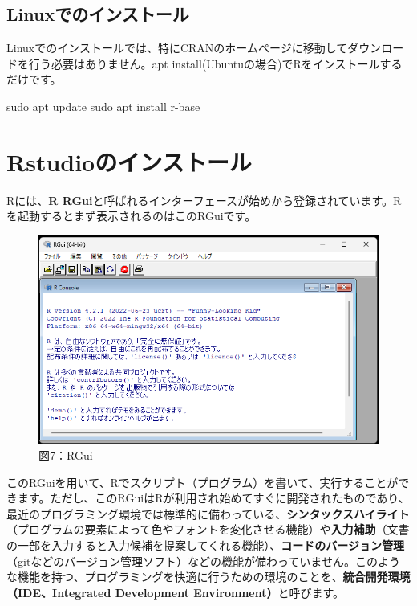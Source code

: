 \documentclass[
  letterpaper,
  DIV=11,
  numbers=noendperiod]{scrreprt}
\newenvironment{Shaded}{\begin{snugshade}}{\end{snugshade}}
\newcommand{\NormalTok}[1]{\textcolor[rgb]{0.00,0.23,0.31}{#1}}
\begin{document}
\hypertarget{linuxux3067ux306eux30a4ux30f3ux30b9ux30c8ux30fcux30eb}{%
\subsection{Linuxでのインストール}\label{linuxux3067ux306eux30a4ux30f3ux30b9ux30c8ux30fcux30eb}}

Linuxでのインストールでは、特にCRANのホームページに移動してダウンロードを行う必要はありません。apt
install(Ubuntuの場合)でRをインストールするだけです。

\begin{Shaded}
\begin{Highlighting}[]
\NormalTok{sudo apt update}
\NormalTok{sudo apt install r{-}base}
\end{Highlighting}
\end{Shaded}

\hypertarget{rstudioux306eux30a4ux30f3ux30b9ux30c8ux30fcux30eb}{%
\section{Rstudioのインストール}\label{rstudioux306eux30a4ux30f3ux30b9ux30c8ux30fcux30eb}}

Rには、\textbf{R
RGui}と呼ばれるインターフェースが始めから登録されています。Rを起動するとまず表示されるのはこのRGuiです。

\begin{figure}

{\centering \includegraphics{././image/RGUI.png}

}

\caption{図7：RGui}

\end{figure}

このRGuiを用いて、Rでスクリプト（プログラム）を書いて、実行することができます。ただし、このRGuiはRが利用され始めてすぐに開発されたものであり、最近のプログラミング環境では標準的に備わっている、\textbf{シンタックスハイライト}（プログラムの要素によって色やフォントを変化させる機能）や\textbf{入力補助}（文書の一部を入力すると入力候補を提案してくれる機能）、\textbf{コードのバージョン管理}（\href{https://git-scm.com/}{git}などのバージョン管理ソフト）などの機能が備わっていません。このような機能を持つ、プログラミングを快適に行うための環境のことを、\textbf{統合開発環境（IDE、Integrated
Development Environment）}と呼びます。
\end{document}
